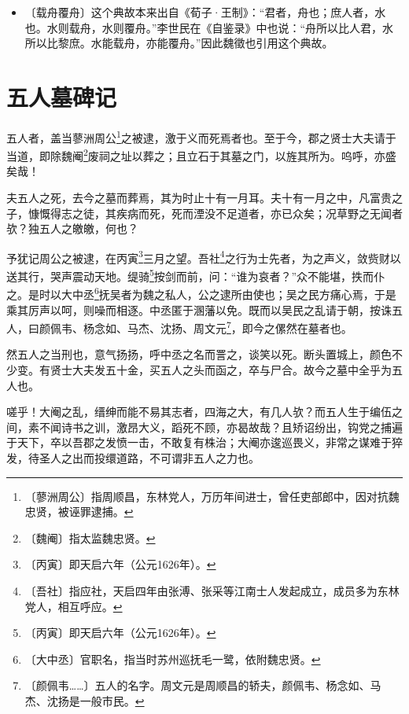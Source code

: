 \documentclass[12pt,UTF-8,openany,a4]{ctexbook}
\begin{document}
\vspace{-1em}

\begin{itemize}
    \setlength\itemsep{-0.2em}
    \item〔载舟覆舟〕{\yiwen 这个典故本来出自《荀子·王制》：“君者，舟也；庶人者，水也。水则载舟，水则覆舟。”李世民在《自鉴录》中也说：“舟所以比人君，水所以比黎庶。水能载舟，亦能覆舟。”因此魏徵也引用这个典故。}
\end{itemize}

\chapter{五人墓碑记}

\begin{large}
    
    五人者，盖当蓼洲周公\footnote{〔蓼洲周公〕\yiwen 指周顺昌，东林党人，万历年间进士，曾任吏部郎中，因对抗魏忠贤，被诬罪逮捕。}之被逮，激于义而死焉者也。至于今，郡之贤士大夫请于当道，即除魏阉\footnote{〔魏阉〕\yiwen 指太监魏忠贤。}废祠之址以葬之；且立石于其墓之门，以旌其所为。呜呼，亦盛矣哉！
    
    夫五人之死，去今之墓而葬焉，其为时止十有一月耳。夫十有一月之中，凡富贵之子，慷慨得志之徒，其疾病而死，死而湮没不足道者，亦已众矣；况草野之无闻者欤？独五人之皦皦，何也？
    
    予犹记周公之被逮，在丙寅\footnote{〔丙寅〕\yiwen 即天启六年（公元1626年）。}三月之望。吾社\footnote{〔吾社〕\yiwen 指应社，天启四年由张溥、张采等江南士人发起成立，成员多为东林党人，相互呼应。}之行为士先者，为之声义，敛赀财以送其行，哭声震动天地。缇骑\footnote{〔丙寅〕\yiwen 即天启六年（公元1626年）。}按剑而前，问：“谁为哀者？”众不能堪，抶而仆之。是时以大中丞\footnote{〔大中丞〕\yiwen 官职名，指当时苏州巡抚毛一鹭，依附魏忠贤。}抚吴者为魏之私人，公之逮所由使也；吴之民方痛心焉，于是乘其厉声以呵，则噪而相逐。中丞匿于溷藩以免。既而以吴民之乱请于朝，按诛五人，曰颜佩韦、杨念如、马杰、沈扬、周文元\footnote{〔颜佩韦……〕\yiwen 五人的名字。周文元是周顺昌的轿夫，颜佩韦、杨念如、马杰、沈扬是一般市民。}，即今之傫然在墓者也。
    
    然五人之当刑也，意气扬扬，呼中丞之名而詈之，谈笑以死。断头置城上，颜色不少变。有贤士大夫发五十金，买五人之头而函之，卒与尸合。故今之墓中全乎为五人也。
    
    嗟乎！大阉之乱，缙绅而能不易其志者，四海之大，有几人欤？而五人生于编伍之间，素不闻诗书之训，激昂大义，蹈死不顾，亦曷故哉？且矫诏纷出，钩党之捕遍于天下，卒以吾郡之发愤一击，不敢复有株治；大阉亦逡巡畏义，非常之谋难于猝发，待圣人之出而投缳道路，不可谓非五人之力也。
    

\end{large}
\end{document}
